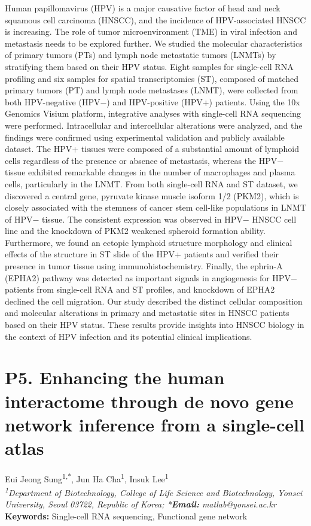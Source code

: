 \noindent
Human papillomavirus (HPV) is a major causative factor of head and neck squamous cell carcinoma (HNSCC), and the incidence of HPV-associated HNSCC is increasing. The role of tumor microenvironment (TME) in viral infection and metastasis needs to be explored further. We studied the molecular characteristics of primary tumors (PTs) and lymph node metastatic tumors (LNMTs) by stratifying them based on their HPV status. Eight samples for single-cell RNA profiling and six samples for spatial transcriptomics (ST), composed of matched primary tumors (PT) and lymph node metastases (LNMT), were collected from both HPV-negative (HPV−) and HPV-positive (HPV+) patients. Using the 10x Genomics Visium platform, integrative analyses with single-cell RNA sequencing were performed. Intracellular and intercellular alterations were analyzed, and the findings were confirmed using experimental validation and publicly available dataset. The HPV+ tissues were composed of a substantial amount of lymphoid cells regardless of the presence or absence of metastasis, whereas the HPV− tissue exhibited remarkable changes in the number of macrophages and plasma cells, particularly in the LNMT. From both single-cell RNA and ST dataset, we discovered a central gene, pyruvate kinase muscle isoform 1/2 (PKM2), which is closely associated with the stemness of cancer stem cell-like populations in LNMT of HPV− tissue. The consistent expression was observed in HPV− HNSCC cell line and the knockdown of PKM2 weakened spheroid formation ability. Furthermore, we found an ectopic lymphoid structure morphology and clinical effects of the structure in ST slide of the HPV+ patients and verified their presence in tumor tissue using immunohistochemistry. Finally, the ephrin-A (EPHA2) pathway was detected as important signals in angiogenesis for HPV− patients from single-cell RNA and ST profiles, and knockdown of EPHA2 declined the cell migration. Our study described the distinct cellular composition and molecular alterations in primary and metastatic sites in HNSCC patients based on their HPV status. These results provide insights into HNSCC biology in the context of HPV infection and its potential clinical implications.
\newpage

\section*{P5. Enhancing the human interactome through de novo gene network inference from a single-cell atlas}

\begin{center}
Eui Jeong Sung\textsuperscript{1,*}, Jun Ha Cha\textsuperscript{1}, Insuk Lee\textsuperscript{1} \\
\vspace{0.3cm}
\textit{\textsuperscript{1}Department of Biotechnology, College of Life Science and Biotechnology, Yonsei University, Seoul 03722, Republic of Korea; *\textbf{Email:} matlab@yonsei.ac.kr} \\
\vspace{0.3cm}
\textbf{Keywords:} Single-cell RNA sequencing, Functional gene network
\end{center}

